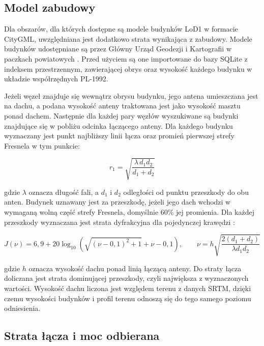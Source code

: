 \subsection{Model zabudowy}

Dla obszarów, dla których dostępne są modele budynków LoD1 w formacie CityGML, uwzględniana jest dodatkowo strata wynikająca z zabudowy. Modele budynków udostępniane są przez Główny Urząd Geodezji i Kartografii w paczkach powiatowych \cite{gugik_lod1}. Przed użyciem są one importowane do bazy SQLite z indeksem przestrzennym, zawierającej obrys oraz wysokość każdego budynku w układzie współrzędnych PL-1992.

Jeżeli węzeł znajduje się wewnątrz obrysu budynku, jego antena umieszczana jest na dachu, a podana wysokość anteny traktowana jest jako wysokość masztu ponad dachem. Następnie dla każdej pary węzłów wyszukiwane są budynki znajdujące się w pobliżu odcinka łączącego anteny. Dla każdego budynku wyznaczany jest punkt najbliższy linii łącza oraz promień pierwszej strefy Fresnela w tym punkcie:

\begin{equation}\label{eq:fresnel}
r_1 = \sqrt{\frac{\lambda\, d_1 d_2}{d_1 + d_2}}
\end{equation}

gdzie \(\lambda\) oznacza długość fali, a \(d_1\) i \(d_2\) odległości od punktu przeszkody do obu anten. Budynek uznawany jest za przeszkodę, jeżeli jego dach wchodzi w wymaganą wolną część strefy Fresnela, domyślnie 60\% jej promienia. Dla każdej przeszkody wyznaczana jest strata dyfrakcyjna dla pojedynczej krawędzi \cite{itu_p526}:

\begin{equation}\label{eq:knife}
J(\nu) = 6{,}9 + 20\log_{10}\left(\sqrt{(\nu - 0{,}1)^2 + 1} + \nu - 0{,}1\right), \qquad \nu = h\sqrt{\frac{2(d_1 + d_2)}{\lambda d_1 d_2}}
\end{equation}

gdzie \(h\) oznacza wysokość dachu ponad linią łączącą anteny. Do straty łącza doliczana jest strata dominującej przeszkody, czyli największa z wyznaczonych wartości. Wysokość dachu liczona jest względem terenu z danych SRTM, dzięki czemu wysokości budynków i profil terenu odnoszą się do tego samego poziomu odniesienia.

\subsection{Strata łącza i moc odbierana}

